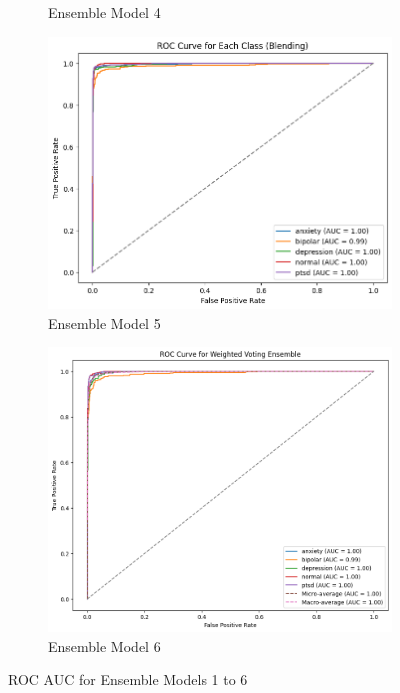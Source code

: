 \begin{figure}[h!]
\begin{subfigure}[b]{0.48\textwidth}
        \caption*{Ensemble Model 4}
        \label{bag roc}  %
    \end{subfigure}
    \hfill
    \begin{subfigure}[b]{0.48\textwidth}
        \centering
        \includegraphics[width=\textwidth]{Images/BLD ROC.png}
        \caption*{Ensemble Model 5}
        \label{bld roc}  %
    \end{subfigure}
    \hfill
    \begin{subfigure}[b]{0.48\textwidth}
        \centering
        \includegraphics[width=\textwidth]{Images/WV ROC.png}
        \caption*{Ensemble Model 6}
        \label{wv roc}  %
    \end{subfigure}
    \label{fig:ensemble_model_comparison}
    \caption*{ROC AUC for Ensemble Models 1 to 6}
\end{figure}

